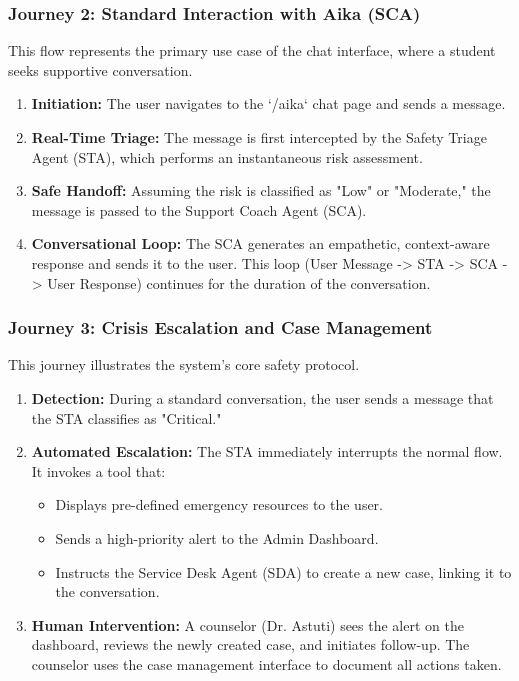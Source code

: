 \subsubsection{Journey 2: Standard Interaction with Aika (SCA)}
This flow represents the primary use case of the chat interface, where a student seeks supportive conversation.
\begin{enumerate}
    \item \textbf{Initiation:} The user navigates to the `/aika` chat page and sends a message.
    \item \textbf{Real-Time Triage:} The message is first intercepted by the Safety Triage Agent (STA), which performs an instantaneous risk assessment.
    \item \textbf{Safe Handoff:} Assuming the risk is classified as "Low" or "Moderate," the message is passed to the Support Coach Agent (SCA).
    \item \textbf{Conversational Loop:} The SCA generates an empathetic, context-aware response and sends it to the user. This loop (User Message -> STA -> SCA -> User Response) continues for the duration of the conversation.
\end{enumerate}

\subsubsection{Journey 3: Crisis Escalation and Case Management}
This journey illustrates the system's core safety protocol.
\begin{enumerate}
    \item \textbf{Detection:} During a standard conversation, the user sends a message that the STA classifies as "Critical."
    \item \textbf{Automated Escalation:} The STA immediately interrupts the normal flow. It invokes a tool that:
        \begin{itemize}
            \item Displays pre-defined emergency resources to the user.
            \item Sends a high-priority alert to the Admin Dashboard.
            \item Instructs the Service Desk Agent (SDA) to create a new case, linking it to the conversation.
        \end{itemize}
    \item \textbf{Human Intervention:} A counselor (Dr. Astuti) sees the alert on the dashboard, reviews the newly created case, and initiates follow-up. The counselor uses the case management interface to document all actions taken.
\end{enumerate}

